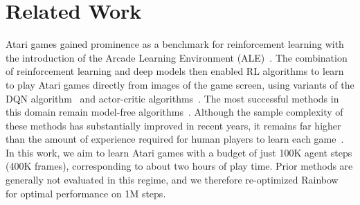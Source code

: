 \section{Related Work}
\label{sec:related_work}

Atari games gained prominence as a benchmark for reinforcement learning with the introduction of the Arcade Learning Environment (ALE)~\cite{ale}. The combination of reinforcement learning and deep models then enabled RL algorithms to learn to play Atari games directly from images of the game screen, using variants of the DQN algorithm~\cite{dqn, dqn2, rainbow} and actor-critic algorithms~\cite{a3c,ppo,ga3c,acktr,vtrace}. The most successful methods in this domain remain model-free algorithms~\cite{rainbow,vtrace}. Although the sample complexity of these methods has substantially improved in recent years, it remains far higher than the amount of experience required for human players to learn each game~\cite{human_atari_minutes}. In this work, we aim to learn Atari games with a budget of just 100K agent steps (400K frames), corresponding to about two hours of play time. Prior methods are generally not evaluated in this regime, and we therefore re-optimized Rainbow~\cite{rainbow} for optimal performance on 1M steps.

